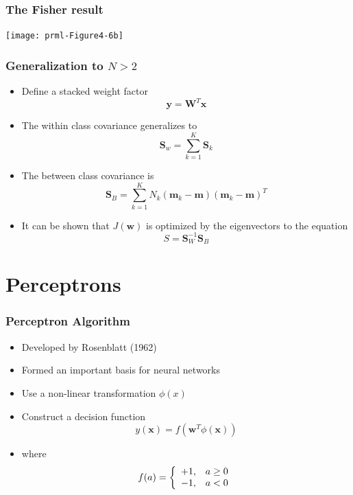 \documentclass[10pt]{beamer}
\begin{document}
\begin{frame}
  \frametitle{The Fisher result}
  \begin{center}
    \texttt{[image: prml-Figure4-6b]}
  \end{center}
\end{frame}

\begin{frame}
  \frametitle{Generalization to $N > 2$}
  \begin{itemize}
  \item Define a stacked weight factor
    \[
    {\mathbf y} = {\mathbf W}^T {\mathbf x}
    \]
  \item The within class covariance generalizes to
    \[
    {\mathbf S}_w = \sum_{k=1}^K {\mathbf S}_k
    \]
  \item The between class covariance is
    \[
    {\mathbf S}_B = \sum_{k=1}^K N_k ({\mathbf m_k} - {\mathbf
      m})({\mathbf m_k} - {\mathbf m})^T
    \]
  \item It can be shown that $J({\mathbf w})$ is optimized by the
    eigenvectors to the equation
    \[
    S = {\mathbf S}_W^{-1} {\mathbf S}_B
    \]
  \end{itemize}
\end{frame}


\section{Perceptrons}

\begin{frame}
  \frametitle{Perceptron Algorithm}
  \begin{itemize}
  \item Developed by Rosenblatt (1962)
  \item Formed an important basis for neural networks
  \item Use a non-linear transformation $\phi(x)$
  \item Construct a decision function
    \[
    y({\mathbf x}) = f\left( {\mathbf w}^T \phi({\mathbf x}) \right)
    \]
  \item where\@
    \[
    f(a) = \left\{
      \begin{array}[c]{cc}
        +1, & a\geq 0 \\
        -1, & a < 0
      \end{array} \right.
    \]
  \end{itemize}
\end{frame}
\end{document}
